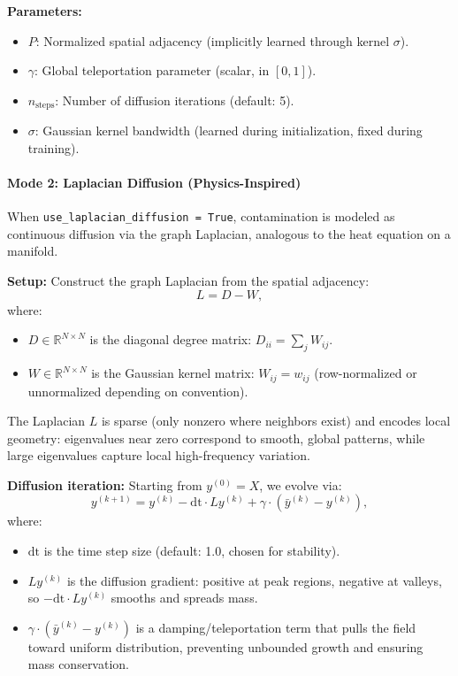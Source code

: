 \documentclass[11pt]{article}
\begin{document}
\textbf{Parameters:}
\begin{itemize}
  \item $P$: Normalized spatial adjacency (implicitly learned through kernel $\sigma$).
  \item $\gamma$: Global teleportation parameter (scalar, in $[0,1]$).
  \item $n_{\text{steps}}$: Number of diffusion iterations (default: 5).
  \item $\sigma$: Gaussian kernel bandwidth (learned during initialization, fixed during training).
\end{itemize}

\paragraph{Mode 2: Laplacian Diffusion (Physics-Inspired)}

When \texttt{use\_laplacian\_diffusion = True}, contamination is modeled as continuous diffusion via the graph Laplacian, analogous to the heat equation on a manifold.

\textbf{Setup:}
Construct the graph Laplacian from the spatial adjacency:
\[
L = D - W,
\]
where:
\begin{itemize}
  \item $D \in \mathbb{R}^{N \times N}$ is the diagonal degree matrix: $D_{ii} = \sum_j W_{ij}$.
  \item $W \in \mathbb{R}^{N \times N}$ is the Gaussian kernel matrix: $W_{ij} = w_{ij}$ (row-normalized or unnormalized depending on convention).
\end{itemize}

The Laplacian $L$ is sparse (only nonzero where neighbors exist) and encodes local geometry: eigenvalues near zero correspond to smooth, global patterns, while large eigenvalues capture local high-frequency variation.

\textbf{Diffusion iteration:}
Starting from $y^{(0)} = X$, we evolve via:
\[
y^{(k+1)} = y^{(k)} - \text{dt} \cdot L y^{(k)} + \gamma \cdot (\bar{y}^{(k)} - y^{(k)}),
\]
where:
\begin{itemize}
  \item $\text{dt}$ is the time step size (default: 1.0, chosen for stability).
  \item $L y^{(k)}$ is the diffusion gradient: positive at peak regions, negative at valleys, so $-\text{dt} \cdot L y^{(k)}$ smooths and spreads mass.
  \item $\gamma \cdot (\bar{y}^{(k)} - y^{(k)})$ is a damping/teleportation term that pulls the field toward uniform distribution, preventing unbounded growth and ensuring mass conservation.
\end{itemize}
\end{document}
